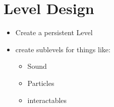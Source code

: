 \chapter{Level Design}
    \begin{itemize}
        \item Create a persistent Level
        \item create sublevels for things like:
        \begin{itemize}
            \item Sound
            \item Particles
            \item interactables
        \end{itemize}
    \end{itemize}

